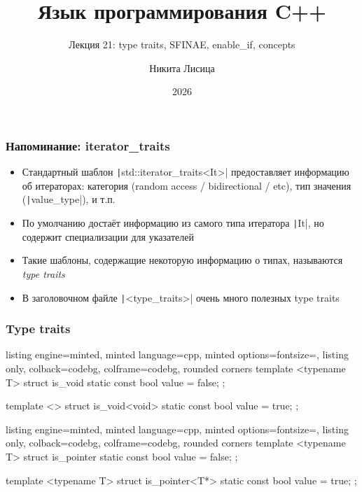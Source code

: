 \documentclass[10pt]{beamer}
\title{Язык программирования C++}
\subtitle{Лекция 21: type traits, SFINAE, enable\_if, concepts}
\date{2026}
\author{Никита Лисица}
\begin{document}
\frame{\titlepage}

\begin{frame}[fragile]
\frametitle{Напоминание: iterator\_traits}
\begin{itemize}
\item Стандартный шаблон \texttt|std::iterator_traits<It>| предоставляет информацию об итераторах: категория (random access / bidirectional / etc), тип значения (\texttt|value_type|), и т.п.
\pause
\item По умолчанию достаёт информацию из самого типа итератора \texttt|It|, но содержит специализации для указателей
\pause
\item Такие шаблоны, содержащие некоторую информацию о типах, называются \textit{type traits}
\pause
\item В заголовочном файле \texttt|<type_traits>| очень много полезных type traits
\end{itemize}
\end{frame}

\begin{frame}[fragile]
\frametitle{Type traits}
\begin{itemize}
\begin{tcblisting}{listing engine=minted, minted language=cpp, minted options={fontsize=\scriptsize}, listing only, colback=codebg, colframe=codebg, rounded corners}
template <typename T>
struct is_void {
  static const bool value = false;
};

template <>
struct is_void<void> {
  static const bool value = true;
};
\end{tcblisting}
\pause
{}
\begin{tcblisting}{listing engine=minted, minted language=cpp, minted options={fontsize=\scriptsize}, listing only, colback=codebg, colframe=codebg, rounded corners}
template <typename T>
struct is_pointer {
  static const bool value = false;
};

template <typename T>
struct is_pointer<T*> {
  static const bool value = true;
};
\end{tcblisting}
\end{itemize}
\end{frame}
\end{document}
